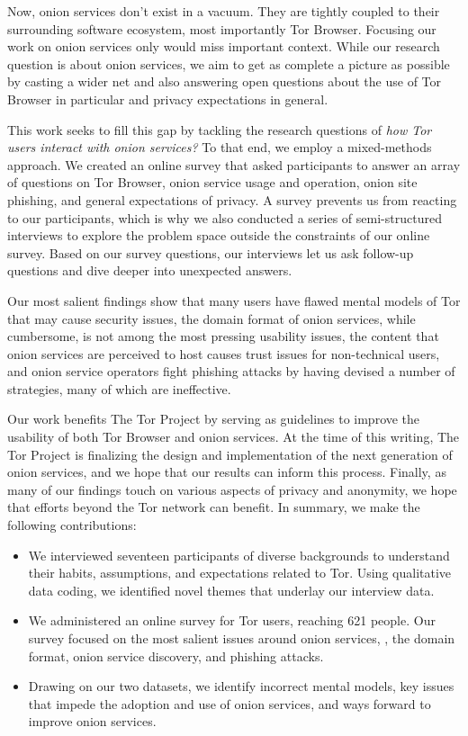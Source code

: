 Now, onion services don't exist in a vacuum.  They are tightly coupled to their
surrounding software ecosystem, most importantly Tor Browser.  Focusing our work
on onion services only would miss important context.  While our research
question is about onion services, we aim to get as complete a picture as
possible by casting a wider net and also answering open questions about the use
of Tor Browser in particular and privacy expectations in general.

This work seeks to fill this gap by tackling the research questions of \emph{how
Tor users interact with onion services?}  To that end, we employ a mixed-methods
approach.  We created an online survey that asked participants to answer an
array of questions on Tor Browser, onion service usage and operation, onion site
phishing, and general expectations of privacy.  A survey prevents us from
reacting to our participants, which is why we also conducted a series of
semi-structured interviews to explore the problem space outside the constraints
of our online survey.  Based on our survey questions, our interviews let us ask
follow-up questions and dive deeper into unexpected answers.

Our most salient findings show that \first many users have flawed mental models
of Tor that may cause security issues, \second the domain format of onion
services, while cumbersome, is not among the most pressing usability issues,
\third the content that onion services are perceived to host causes trust issues
for non-technical users, and \fourth onion service operators fight phishing
attacks by having devised a number of strategies, many of which are ineffective.

Our work benefits The Tor Project by serving as guidelines to improve the
usability of both Tor Browser and onion services.  At the time of this writing,
The Tor Project is finalizing the design and implementation of the next
generation of onion services, and we hope that our results can inform this
process.  Finally, as many of our findings touch on various aspects of privacy
and anonymity, we hope that efforts beyond the Tor network can benefit.  In
summary, we make the following contributions:

\begin{itemize}
    \item We interviewed seventeen participants of diverse backgrounds to
        understand their habits, assumptions, and expectations related to Tor.
        Using qualitative data coding, we identified novel themes that underlay
        our interview data.

    \item We administered an online survey for Tor users, reaching 621 people.
        Our survey focused on the most salient issues around onion services,
        \eg, the domain format, onion service discovery, and phishing attacks.

    \item Drawing on our two datasets, we identify \first incorrect mental
        models, \second key issues that impede the adoption and use of onion
        services, and \third ways forward to improve onion services.
\end{itemize}

